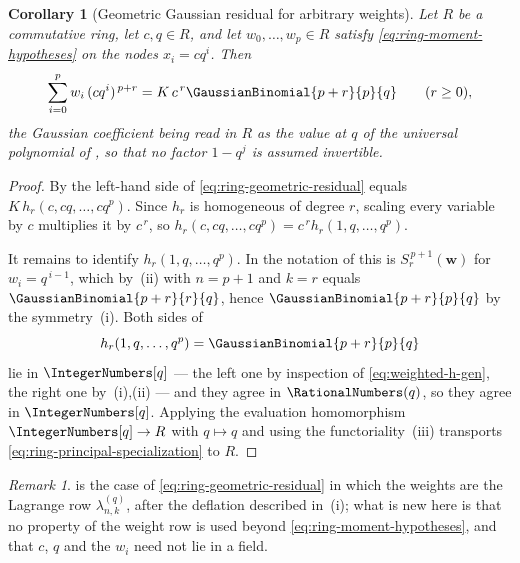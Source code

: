 \documentclass[11pt,a4paper,oneside,openany]{book}
\newtheorem{corollary}[corollary]{Corollary}
\theoremstyle{definition}
\theoremstyle{remark}
\newtheorem{remark}[remark]{Remark}
\begin{document}
\begin{corollary}[Geometric Gaussian residual for arbitrary weights]
\label{cor:ring-geometric-residual}
Let $R$ be a commutative ring, let $c,q\in R$, and let $w_0,\ldots,w_p\in R$
satisfy \eqref{eq:ring-moment-hypotheses} on the nodes $x_i=cq^i$.  Then
\begin{equation}\label{eq:ring-geometric-residual}
 \sum_{i=0}^{p}w_i\,(cq^i)^{\,p+r}
 =K\,c^{\,r}\GaussianBinomial{p+r}{p}{q}
 \qquad(r\ge0),
\end{equation}
the Gaussian coefficient being read in $R$ as the value at $q$ of the universal
polynomial of , so that no factor $1-q^j$ is
assumed invertible.
\end{corollary}

\begin{proof}
By  the left-hand side of
\eqref{eq:ring-geometric-residual} equals $K\,h_r(c,cq,\ldots,cq^p)$.  Since
$h_r$ is homogeneous of degree $r$, scaling every variable by $c$ multiplies it
by $c^{\,r}$, so $h_r(c,cq,\ldots,cq^p)=c^{\,r}h_r(1,q,\ldots,q^p)$.

It remains to identify $h_r(1,q,\ldots,q^p)$.  In the notation of
 this is $S_r^{\,p+1}(\mathbf w)$ for $w_i=q^{\,i-1}$, which
by \,(ii) with $n=p+1$ and $k=r$ equals
$\GaussianBinomial{p+r}{r}{q}$, hence $\GaussianBinomial{p+r}{p}{q}$ by the symmetry
\,(i).  Both sides of
\begin{equation}\label{eq:ring-principal-specialization}
 h_r(1,q,\ldots,q^p)=\GaussianBinomial{p+r}{p}{q}
\end{equation}
lie in $\IntegerNumbers[q]$ --- the left one by inspection of
\eqref{eq:weighted-h-gen}, the right one by
\,(i),(ii) --- and they agree in $\RationalNumbers(q)$, so
they agree in $\IntegerNumbers[q]$.  Applying the evaluation homomorphism $\IntegerNumbers[q]\to R$ with
$q\mapsto q$ and using the functoriality
\,(iii) transports
\eqref{eq:ring-principal-specialization} to $R$.
\end{proof}

\begin{remark}\label{rem:ring-geometric-vs-lagrange}
 is the case of
\eqref{eq:ring-geometric-residual} in which the weights are the Lagrange row
$\lambda^{(q)}_{n,k}$, after the deflation described in
\,(i); what is new here is that no property
of the weight row is used beyond \eqref{eq:ring-moment-hypotheses}, and that
$c$, $q$ and the $w_i$ need not lie in a field.
\end{remark}
\end{document}
